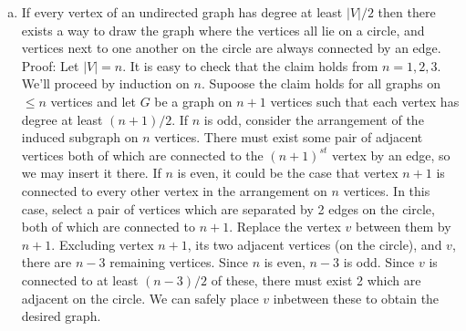 \documentclass{article}
\begin{document}
\begin{enumerate}[a.]
\item If every vertex of an undirected graph has degree at least $|V|/2$ then there exists a way to draw the graph where the vertices all lie on a circle, and vertices next to one another on the circle are always connected by an edge. Proof: Let $|V| = n$.  It is easy to check that the claim holds from $n=1, 2, 3$.  We'll proceed by induction on $n$.  Supoose the claim holds for all graphs on $\leq n $ vertices and let $G$ be a graph on $n+1$ vertices such that each vertex has degree at least $(n+1)/2$.  If $n$ is odd, consider the arrangement of the induced subgraph on $n$ vertices.  There must exist some pair of adjacent vertices both of which are connected to the $(n+1)^{st}$ vertex by an edge, so we may insert it there.  If $n$ is even, it could be the case that vertex $n+1$ is connected to every other vertex in the arrangement on $n$ vertices.  In this case, select a pair of vertices which are separated by 2 edges on the circle, both of which are connected to $n+1$.  Replace the vertex $v$ between them by $n+1$.  Excluding vertex $n+1$, its two adjacent vertices (on the circle), and $v$, there are $n-3$ remaining vertices.  Since $n$ is even, $n-3$ is odd.  Since $v$ is connected to at least $(n-3)/2$ of these, there must exist 2 which are adjacent on the circle.  We can safely place $v$ inbetween these to obtain the desired graph. 
\end{enumerate}
\end{document}

